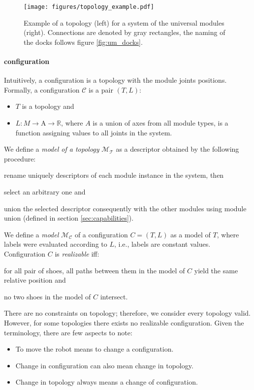 \begin{figure}[t]
    \centering
    \texttt{[image: figures/topology\_example.pdf]}
    \caption{Example of a topology (left) for a system of the universal modules
    (right). Connections are denoted by gray rectangles, the naming of the docks
    follows figure \ref{fig:um_docks}. }
    \label{fig:topology_example}
\end{figure}

\paragraph{configuration} Intuitively, a configuration is a topology with the
 module joints positions. Formally, a configuration $\mathcal{C}$ is a pair $(T,
 L)$:
 \begin{itemize}
    \item $T$ is a topology and
    \item $L: M \rightarrow \text{A} \rightarrow \mathds{R}$, where $A$ is a
    union of axes from all module types, is a function assigning values to all
    joints in the system.
 \end{itemize}

We define a \emph{model of a topology} $\mathcal{M}_\mathcal{T}$ as a descriptor
obtained by the following procedure:
\begin{enumerate*}
    \item rename uniquely descriptors of each module instance in the system, then
    \item select an arbitrary one and
    \item union the selected descriptor consequently with the other modules
    using module union (defined in section \ref{sec:capabilities}).
\end{enumerate*}
We define a \emph{model} $\mathcal{M}_\mathcal{C}$ of a configuration
$C=(T, L)$ as a model of $T$, where labels were evaluated according to $L$,
i.e., labels are constant values. Configuration $C$ is \emph{realizable} iff:
\begin{enumerate*}
    \item for all pair of shoes, all paths between them in the model of $C$
    yield the same relative position and
    \item no two shoes in the model of $C$ intersect.
\end{enumerate*}

There are no constraints on topology; therefore, we consider every topology
valid. However, for some topologies there exists no realizable configuration.
Given the terminology, there are few aspects to note:
\begin{itemize}
    \item To move the robot means to change a configuration.
    \item Change in configuration can also mean change in topology.
    \item Change in topology always means a change of configuration.
\end{itemize}

